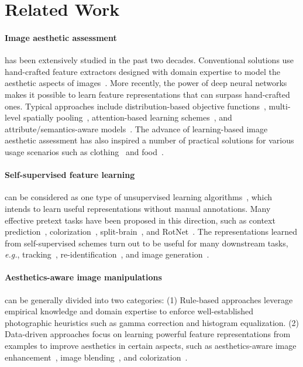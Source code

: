 \documentclass[letterpaper]{article}
\newcommand{\commentout}[1]{} %
\begin{document}
\section{Related Work}

\paragraph{Image aesthetic assessment} has been extensively studied in the past two decades.
Conventional solutions use hand-crafted feature extractors designed with domain expertise to model the aesthetic aspects of images~\cite{datta2006studying,ke2006the}. More recently, the power of deep neural networks makes it possible to learn feature representations that can surpass hand-crafted ones.
Typical approaches include distribution-based objective functions~\cite{talebi2018nima,jin2018predicting}, multi-level spatially pooling~\cite{hosu2019effective}, attention-based learning schemes~\cite{sheng2018attention}, and attribute/semantics-aware models~\cite{ma2017lamp,pan2019image}.
The advance of learning-based image aesthetic assessment has also inspired a number of practical solutions for various usage scenarios such as clothing~\cite{yu2018aesthetic} and food~\cite{Sheng:2018:GPD}.

\paragraph{Self-supervised feature learning} can be considered as one type of unsupervised learning algorithms~\cite{de1994learning}, which intends to learn useful representations without manual annotations.
Many effective pretext tasks have been proposed in this direction, such as context prediction~\cite{doersch2015unsupervised}, colorization~\cite{zhang2016colorful}, split-brain~\cite{zhang2017split}, and RotNet~\cite{gidaris2018unsupervised}.
The representations learned from self-supervised schemes turn out to be useful for many downstream tasks, \emph{e.g.}, tracking~\cite{vondrick2018tracking}, re-identification~\cite{fan2018unsupervised}, and image generation~\cite{lucic2019high-fidelity}\commentout{, especially in the case of using fewer labels}.

\paragraph{Aesthetics-aware image manipulations} can be generally divided into two categories:
(1) Rule-based approaches leverage empirical knowledge and domain expertise to enforce well-established photographic heuristics such as gamma correction and histogram equalization.
(2) Data-driven approaches focus on learning powerful feature representations from examples to improve aesthetics in certain aspects, such as aesthetics-aware image enhancement~\cite{deng2018aesthetic,hu2018exposure}, image blending~\cite{Hung_blend_2018}, and colorization~\cite{zhang2016colorful}.
\end{document}
